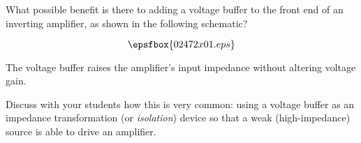 

What possible benefit is there to adding a voltage buffer to the front end of an inverting amplifier, as shown in the following schematic?

$$\epsfbox{02472x01.eps}$$







The voltage buffer raises the amplifier's input impedance without altering voltage gain.







Discuss with your students how this is very common: using a voltage buffer as an impedance transformation (or {\it isolation}) device so that a weak (high-impedance) source is able to drive an amplifier.




